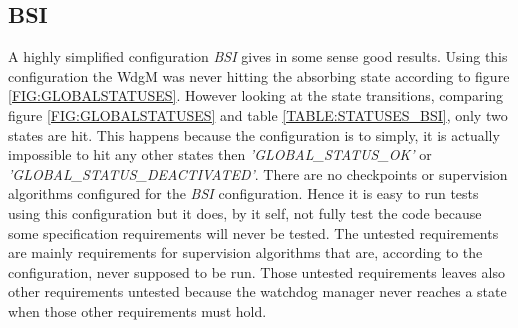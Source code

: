 \subsection{BSI}
A highly simplified configuration \emph{BSI} gives in some sense good results.
Using this configuration the WdgM was never hitting the absorbing state
according to figure \ref{FIG:GLOBALSTATUSES}.  However looking at the state
transitions, comparing figure \ref{FIG:GLOBALSTATUSES} and table
\ref{TABLE:STATUSES_BSI}, only two states are hit. This happens
because the configuration is to simply, it is actually impossible to hit
any other states then \emph{'GLOBAL\_STATUS\_OK'} or
\emph{'GLOBAL\_STATUS\_DEACTIVATED'}. There are no checkpoints or supervision
algorithms configured for the \emph{BSI} configuration.
Hence it is easy to run tests using this configuration but it does, by it self,
not fully test the code because some specification requirements will never be
tested. The untested requirements are mainly requirements for supervision algorithms
that are, according to the configuration, never supposed to be run. Those
untested requirements leaves also other requirements untested because
the watchdog manager never reaches a state when those other requirements must hold.
